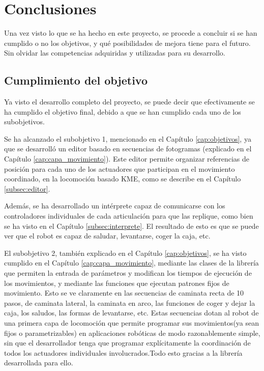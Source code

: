 \chapter{Conclusiones}\label{cap:conclusiones}

Una vez visto lo que se ha hecho en este proyecto, se procede a concluir si se han cumplido o no los objetivos, y qué posibilidades de mejora tiene para el futuro. Sin olvidar las competencias adquiridas y utilizadas para su desarrollo.

\section{Cumplimiento del objetivo}

Ya visto el desarrollo completo del proyecto, se puede decir que efectivamente se ha cumplido el objetivo final, debido a que se han cumplido cada uno de los subobjetivos.

Se ha alcanzado el subobjetivo 1, mencionado en el Capítulo \ref{cap:objetivos}, ya que se desarrolló un editor basado en secuencias de fotogramas (explicado en el Capítulo \ref{cap:capa_movimiento}). Este editor permite organizar referencias de posición para cada uno de los actuadores que participan en el movimiento coordinado, en la locomoción basado KME, como se describe en el Capítulo \ref{subsec:editor}.

Además, se ha desarrollado un intérprete capaz de comunicarse con los controladores individuales de cada articulación para que las replique, como bien se ha visto en el Capítulo \ref{subsec:interprete}. El resultado de esto es que se puede ver que el robot es capaz de saludar, levantarse, coger la caja, etc.

El subobjetivo 2, también explicado en el  Capítulo \ref{cap:objetivos}, se ha visto cumplido en el Capítulo \ref{cap:capa_movimiento}, mediante las clases de la librería que permiten la entrada de parámetros y modifican los tiempos de ejecución de los movimientos, y mediante las funciones que ejecutan patrones fijos de movimiento. Esto se ve claramente en las secuencias de caminata recta de 10 pasos, de caminata lateral, la caminata en arco, las funciones de coger y dejar la caja, los saludos, las formas de levantarse, etc. Estas secuencias dotan al robot de una primera capa de locomoción que permite programar sus movimientos(ya sean fijos o parametrizables) en aplicaciones robóticas de modo razonablemente simple, sin que el desarrollador tenga que programar explícitamente la coordinación de todos los actuadores individuales involucrados.Todo esto gracias a la librería desarrollada para ello.

